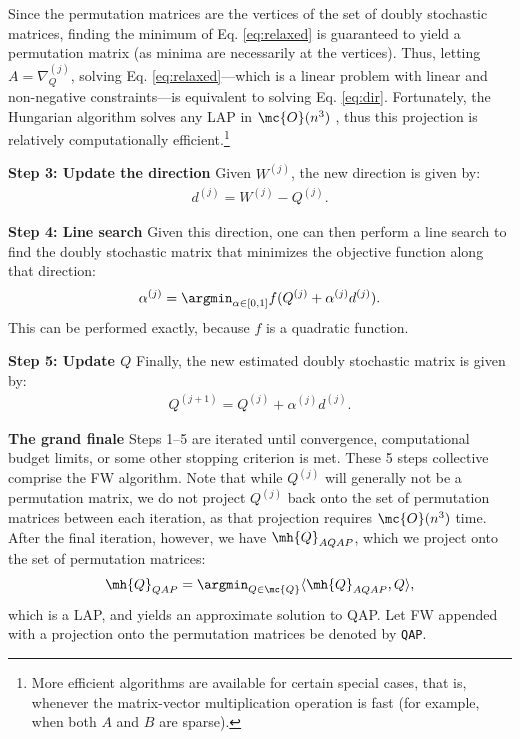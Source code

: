 \documentclass[10pt,journal,cspaper,compsoc]{IEEEtran}
\begin{document}
Since the permutation matrices are the vertices of the set of doubly stochastic matrices, finding the minimum of Eq. \eqref{eq:relaxed} is guaranteed to yield a permutation matrix (as minima are necessarily at the vertices).  Thus, letting $A=\nabla_Q^{(j)}$, solving Eq. \eqref{eq:relaxed}---which is a linear problem with linear and non-negative constraints---is equivalent to solving Eq. \eqref{eq:dir}.  Fortunately, the Hungarian algorithm solves any LAP in $\mc{O}(n^3)$ \cite{Burkard2009}, thus this projection is relatively computationally efficient.\footnote{More efficient algorithms are available for certain special cases, that is, whenever the matrix-vector multiplication operation is fast (for example, when both $A$ and $B$ are sparse).}

\textbf{Step 3: Update the direction} Given $W^{(j)}$, the new direction is given by:
\begin{align}
	d^{(j)}=W^{(j)}-Q^{(j)}.
\end{align}


\textbf{Step 4: Line search} Given this direction, one can then perform a line search to find the doubly stochastic matrix that minimizes the objective function along that direction:
\begin{align}
	\alpha^{(j)} = \argmin_{\alpha \in [0,1]} f(Q^{(j)} + \alpha^{(j)} d^{(j)}).
\end{align}
This can be performed exactly, because $f$ is a quadratic function.  


\textbf{Step 5: Update $Q$} Finally, the new estimated doubly stochastic matrix is given by:
\begin{align}\label{eq:update}
	Q^{(j+1)} = Q^{(j)} + \alpha^{(j)} d^{(j)}.
\end{align}


\textbf{The grand finale} Steps 1--5 are iterated until convergence, computational budget limits, or some other stopping criterion is met.  These 5 steps collective comprise the FW algorithm.  Note that while $Q^{(j)}$ will generally not be a permutation matrix, we do not project $Q^{(j)}$ back onto the set of permutation matrices between each iteration, as that projection requires $\mc{O}(n^3)$ time. After the final iteration, however, we have $\mh{Q}_{AQAP}$, which we project onto the set of permutation matrices:
\begin{align} \label{eq:proj}
	\mh{Q}_{QAP} = \argmin_{Q \in \mc{Q}} \langle \mh{Q}_{AQAP}, Q \rangle,
\end{align}
which is a LAP, and yields an approximate solution to QAP.  Let FW appended with a projection onto the permutation matrices be denoted by \texttt{QAP}.
\end{document}
